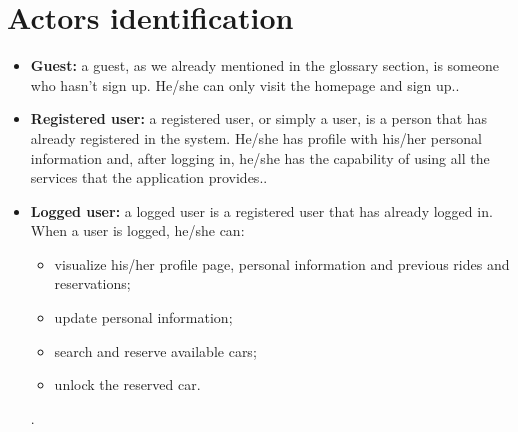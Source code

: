 \pagebreak
\section{Actors identification}

\newcommand{\actor}[2]{
	\item \textbf{#1:} #2.}

\begin{itemize}
	\actor {Guest}{a guest, as we already mentioned in the glossary section, is someone who hasn't sign up. He/she can only visit the homepage and sign up.}
	\actor{Registered user}{a registered user, or simply a user, is a person that has already registered in the system. He/she has profile with his/her personal information and, after logging in, he/she has the capability of using all the services that the application provides.}
	\actor{Logged user}{a logged user is a registered user that has already logged in. When a user is logged, he/she can:
		\begin{itemize}
			\item visualize his/her profile page, personal information and previous rides and reservations;
			\item update personal information;
			\item search and reserve available cars;
			\item unlock the reserved car.
		\end{itemize}
	}
\end{itemize}